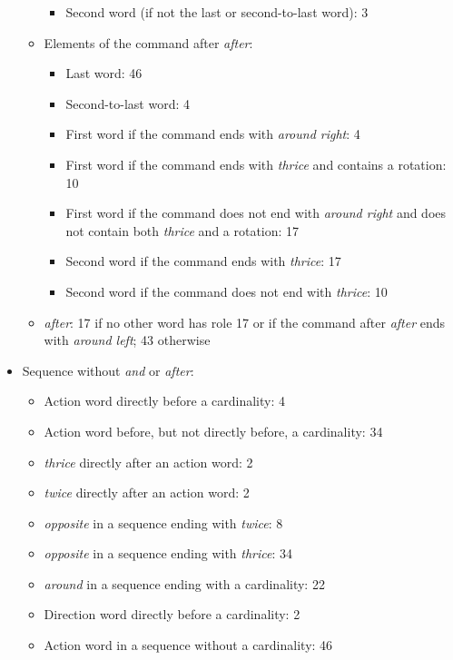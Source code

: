 \begin{itemize}
\begin{itemize}
\begin{itemize}
            \item Second word (if not the last or second-to-last word): 3
        \end{itemize}
        \item Elements of the command after \textit{after}:
        \begin{itemize}
            \item Last word: 46
            \item Second-to-last word: 4
            \item First word if the command ends with \textit{around right}: 4
            \item First word if the command ends with \textit{thrice} and contains a rotation: 10
            \item First word if the command does not end with \textit{around right} and does not contain both \textit{thrice} and a rotation: 17
            \item Second word if the command ends with \textit{thrice}: 17
            \item Second word if the command does not end with \textit{thrice}: 10
        \end{itemize}
        \item \textit{after}: 17 if no other word has role 17 or if the command after \textit{after} ends with \textit{around left}; 43 otherwise
    \end{itemize}
    \item Sequence without \textit{and} or \textit{after}:
    \begin{itemize}
        \item Action word directly before a cardinality: 4
        \item Action word before, but not directly before, a cardinality: 34
        \item \textit{thrice} directly after an action word: 2
        \item \textit{twice} directly after an action word: 2
        \item \textit{opposite} in a sequence ending with \textit{twice}: 8
        \item \textit{opposite} in a sequence ending with \textit{thrice}: 34
        \item \textit{around} in a sequence ending with a cardinality:  22
        \item Direction word directly before a cardinality: 2
        \item Action word in a sequence without a cardinality: 46

\end{itemize}
\end{itemize}
